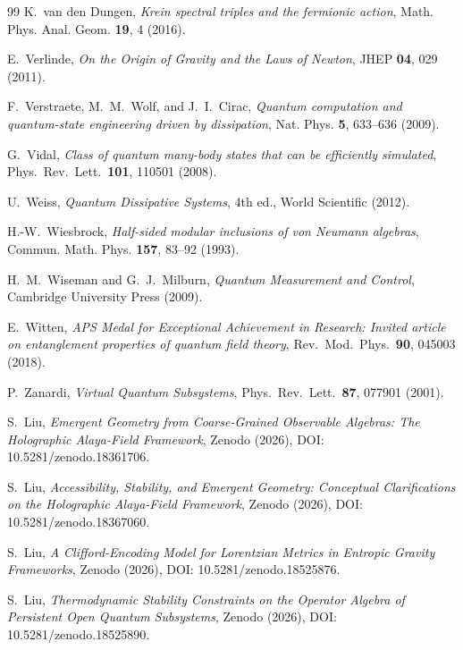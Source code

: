 \documentclass[12pt,a4paper,openany]{book}
\begin{document}
\begin{thebibliography}{99}
K.~van den Dungen, \emph{Krein spectral triples and the fermionic action}, Math. Phys. Anal. Geom. \textbf{19}, 4 (2016).

E.~Verlinde, \emph{On the Origin of Gravity and the Laws of Newton}, JHEP \textbf{04}, 029 (2011).

F.~Verstraete, M.~M.~Wolf, and J.~I.~Cirac, \emph{Quantum computation and quantum-state engineering driven by dissipation}, Nat. Phys. \textbf{5}, 633--636 (2009).

G.~Vidal, \emph{Class of quantum many-body states that can be efficiently simulated}, Phys.\ Rev.\ Lett.\ \textbf{101}, 110501 (2008).

U.~Weiss, \emph{Quantum Dissipative Systems}, 4th ed., World Scientific (2012).

H.-W.~Wiesbrock, \emph{Half-sided modular inclusions of von Neumann algebras}, Commun. Math. Phys. \textbf{157}, 83--92 (1993).

H.~M.~Wiseman and G.~J.~Milburn, \emph{Quantum Measurement and Control}, Cambridge University Press (2009).

E.~Witten, \emph{APS Medal for Exceptional Achievement in Research: Invited article on entanglement properties of quantum field theory}, Rev.\ Mod.\ Phys.\ \textbf{90}, 045003 (2018).

P.~Zanardi, \emph{Virtual Quantum Subsystems}, Phys.\ Rev.\ Lett.\ \textbf{87}, 077901 (2001).

S.~Liu, \emph{Emergent Geometry from Coarse-Grained Observable Algebras: The Holographic Alaya-Field Framework}, Zenodo (2026), DOI: 10.5281/zenodo.18361706.

S.~Liu, \emph{Accessibility, Stability, and Emergent Geometry: Conceptual Clarifications on the Holographic Alaya-Field Framework}, Zenodo (2026), DOI: 10.5281/zenodo.18367060.

S.~Liu, \emph{A Clifford-Encoding Model for Lorentzian Metrics in Entropic Gravity Frameworks}, Zenodo (2026), DOI: 10.5281/zenodo.18525876.

S.~Liu, \emph{Thermodynamic Stability Constraints on the Operator Algebra of Persistent Open Quantum Subsystems}, Zenodo (2026), DOI: 10.5281/zenodo.18525890.

\end{thebibliography}
\end{document}
